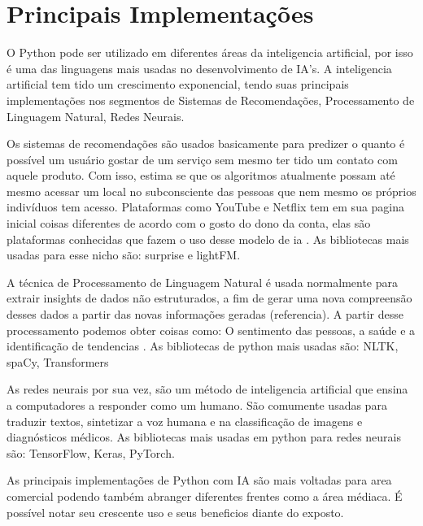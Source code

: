 \section{Principais Implementações}

O Python pode ser utilizado em diferentes áreas da inteligencia artificial, por isso é uma das linguagens mais usadas no desenvolvimento de IA’s. A inteligencia artificial tem tido um crescimento exponencial, tendo suas principais implementações nos segmentos de Sistemas de Recomendações, Processamento de Linguagem Natural, Redes Neurais.

Os sistemas de recomendações são usados basicamente para predizer o quanto é possível um usuário gostar de um serviço sem mesmo ter tido um contato com aquele produto. Com isso, estima se que os algoritmos atualmente possam até mesmo acessar um local no subconsciente das pessoas que nem mesmo os próprios indivíduos tem acesso. Plataformas como YouTube e Netflix tem em sua pagina inicial coisas diferentes de acordo com o gosto do dono da conta, elas são plataformas conhecidas que fazem o uso desse modelo de ia \cite{didatica2024}. As bibliotecas mais usadas para esse nicho são: surprise e lightFM.

A técnica de Processamento de Linguagem Natural é usada normalmente para extrair insights de dados não estruturados, a fim de gerar uma nova compreensão desses dados a partir das novas informações geradas (referencia). A partir desse processamento podemos obter coisas como: O sentimento das pessoas, a saúde e a identificação de tendencias \cite{google2024}. As bibliotecas de python mais usadas são: NLTK, spaCy, Transformers

As redes neurais por sua vez, são um método de inteligencia artificial que ensina a computadores a responder como um humano. \cite{aws2024} São comumente usadas para traduzir textos, sintetizar a voz humana e na classificação de imagens e diagnósticos médicos. As bibliotecas mais usadas em python para redes neurais são: TensorFlow, Keras, PyTorch.

As principais implementações de Python com IA são mais voltadas para area comercial podendo também abranger diferentes frentes como a área médiaca. É possível notar seu crescente uso e seus beneficios diante do exposto.